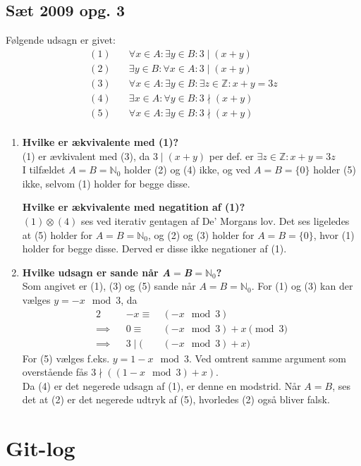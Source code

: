 \documentclass[12pt, a4paper]{article}
\begin{document}
\subsection{Sæt 2009 opg. 3}
Følgende udsagn er givet:
\begin{align*}
	(1)&\quad\forall x\in A:\exists y\in B:3\mid(x+y)\\
	(2)&\quad\exists y\in B:\forall x\in A:3\mid(x+y)\\
	(3)&\quad\forall x\in A:
		\exists y\in B:
		\exists z\in\mathbb{Z}:
		x+y=3z\\
	(4)&\quad\exists x\in A:\forall y\in B:3\nmid(x+y)\\
	(5)&\quad\forall x\in A:\exists y\in B:3\nmid(x+y)\\
\end{align*}
\begin{enumerate}[label=\alph*)]
	\item {
		\textbf{Hvilke er ækvivalente med (1)?} \\
		(1) er ævkivalent med (3), da $3\mid (x+y)$ per def. er $ \exists z\in\mathbb{Z}: x+y=3z$ \\
		I tilfældet $A=B=\mathbb{N}_0$ holder (2) og (4) ikke, og ved $A=B=\{0\}$ holder (5) ikke,
		selvom (1) holder for begge disse.
		
		\textbf{Hvilke er ækvivalente med negatition af (1)?} \\
		$(1)\otimes (4)$ ses ved iterativ gentagen af De' Morgans lov.
		Det ses ligeledes at (5) holder for $A=B=\mathbb{N}_0$, og (2) og (3) holder for $A=B=\{0\}$, hvor (1) holder for begge disse. Derved er disse ikke negationer af (1).
	}
	\item {
		\textbf{Hvilke udsagn er sande når \textit{A}$=$\textit{B}$=\mathbb{N}_0$?} \\
		Som angivet er (1), (3) og (5) sande når $A=B=\mathbb{N}_0$.
		For (1) og (3) kan der vælges $y=-x \mod 3$, da
		\begin{alignat*}{2}
			        && -x \equiv\ &(-x\!\!\!\mod 3)  \\
			\implies&&  0 \equiv\ &(-x\!\!\!\mod 3)+x \pmod{3} \\
			\implies&&    3 \mid (&(-x\!\!\!\mod 3)+x)
		\end{alignat*}	
		For (5) vælges f.eks. $y=1-x\!\!\mod 3$. Ved omtrent samme argument som overstående fås $3\nmid((1-x\!\!\mod 3)+x)$. \\
		Da (4) er det negerede udsagn af (1), er denne en modstrid.
		Når $A=B$, ses det at (2) er det negerede udtryk af (5), hvorledes (2) også bliver falsk.
	}
\end{enumerate}

\newpage
\section{Git-log}
\inputminted{bash}{git-log.txt}
\end{document}
